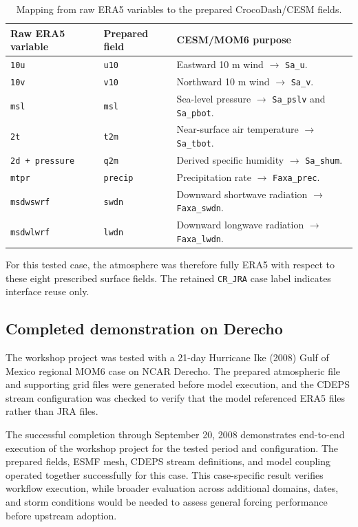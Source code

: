 \documentclass[11pt]{article}
\newcommand{\code}[1]{\texttt{#1}}
\begin{document}
\begin{table}[htbp]
\centering
\caption{Mapping from raw ERA5 variables to the prepared CrocoDash/CESM fields.}
\label{tab:fields}
\begin{tabularx}{\textwidth}{@{}L{0.18\textwidth}L{0.18\textwidth}Y@{}}
\toprule
\textbf{Raw ERA5 variable} & \textbf{Prepared field} & \textbf{CESM/MOM6 purpose} \\
\midrule
\code{10u} & \code{u10} & Eastward 10 m wind $\rightarrow$ \code{Sa\_u}. \\
\code{10v} & \code{v10} & Northward 10 m wind $\rightarrow$ \code{Sa\_v}. \\
\code{msl} & \code{msl} & Sea-level pressure $\rightarrow$ \code{Sa\_pslv} and \code{Sa\_pbot}. \\
\code{2t} & \code{t2m} & Near-surface air temperature $\rightarrow$ \code{Sa\_tbot}. \\
\code{2d + pressure} & \code{q2m} & Derived specific humidity $\rightarrow$ \code{Sa\_shum}. \\
\code{mtpr} & \code{precip} & Precipitation rate $\rightarrow$ \code{Faxa\_prec}. \\
\code{msdwswrf} & \code{swdn} & Downward shortwave radiation $\rightarrow$ \code{Faxa\_swdn}. \\
\code{msdwlwrf} & \code{lwdn} & Downward longwave radiation $\rightarrow$ \code{Faxa\_lwdn}. \\
\bottomrule
\end{tabularx}
\end{table}

For this tested case, the atmosphere was therefore fully ERA5 with respect to these eight prescribed surface fields. The retained \code{CR\_JRA} case label indicates interface reuse only.

\subsection{Completed demonstration on Derecho}

The workshop project was tested with a 21-day Hurricane Ike (2008) Gulf of Mexico regional MOM6 case on NCAR Derecho. The prepared atmospheric file and supporting grid files were generated before model execution, and the CDEPS stream configuration was checked to verify that the model referenced ERA5 files rather than JRA files.

The successful completion through September 20, 2008 demonstrates end-to-end execution of the workshop project for the tested period and configuration. The prepared fields, ESMF mesh, CDEPS stream definitions, and model coupling operated together successfully for this case. This case-specific result verifies workflow execution, while broader evaluation across additional domains, dates, and storm conditions would be needed to assess general forcing performance before upstream adoption.
\end{document}
